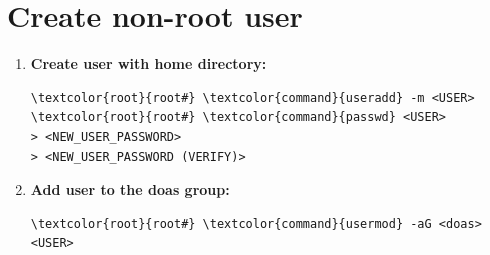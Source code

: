 \documentclass[10pt, a4paper, onecolumn, oneside, titlepage, openany]{book}
\begin{document}
\section{Create non-root user}
\begin{enumerate}
    \item \textbf{Create user with home directory:}
\begin{Verbatim}[commandchars=\\\{\}]
\textcolor{root}{root#} \textcolor{command}{useradd} -m <USER>
\textcolor{root}{root#} \textcolor{command}{passwd} <USER>
> <NEW_USER_PASSWORD>
> <NEW_USER_PASSWORD (VERIFY)>
\end{Verbatim}
    \item \textbf{Add user to the doas group:}
\begin{Verbatim}[commandchars=\\\{\}]
\textcolor{root}{root#} \textcolor{command}{usermod} -aG <doas> <USER>
\end{Verbatim}
\end{enumerate}
\end{document}
